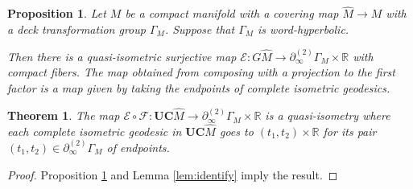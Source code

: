\documentclass[10pt,a4paper]{amsart}
\newtheorem{proposition}{Proposition}
\newtheorem{theorem}{Theorem}
\newcommand{\Uc}{\mathbf{UC}}
\newcommand\bR{{\mathbb{R}}}
\newcommand\ra{\rightarrow}
\begin{document}
\begin{proposition} \label{prop:Uc} 
	Let $M$ be a compact manifold with a covering map $\hat M \ra M$
	with a deck transformation group $\Gamma_M$. 
	Suppose that $\Gamma_M$ is word-hyperbolic.

	Then there is 
	a quasi-isometric surjective map 
	$\mathcal{E}: G\hat M \ra \partial^{(2)}_\infty \Gamma_M \times \bR$ with compact fibers. 
	The map obtained from composing with 
	a projection to the first factor is a map given by taking the endpoints of complete isometric geodesics. 
\end{proposition} 

\begin{theorem}\label{thm:identify} 
	The map	
	$\mathcal{E}\circ \mathcal{F}:\Uc \hat M \ra \partial_\infty^{(2)} \Gamma_M \times \bR$ 
	is a quasi-isometry where each complete isometric 
	geodesic in $\Uc \hat M$ goes to 
	$(t_1,t_2)\times \bR$ for its pair $(t_1, t_2)\in \partial_\infty^{(2)} \Gamma_M$ 
    of endpoints. 
\end{theorem} 

\begin{proof} 
	Proposition \ref{prop:Uc} and Lemma \ref{lem:identify} imply
	the result. %
\end{proof} 
\end{document}
